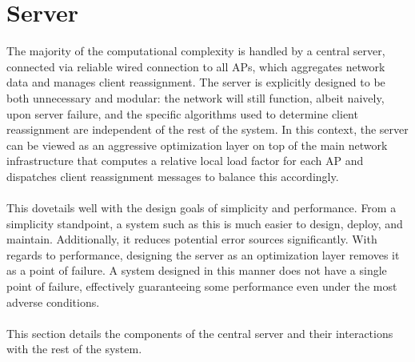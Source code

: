 \documentclass[10pt,journal,compsoc]{IEEEtran}
\begin{document}
		\section{Server}
		The majority of the computational complexity is handled by a central server, connected via reliable wired connection to all APs, which aggregates network data and manages client reassignment. The server is explicitly designed to be both unnecessary and modular: the network will still function, albeit naively, upon server failure, and the specific algorithms used to determine client reassignment are independent of the rest of the system. In this context, the server can be viewed as an aggressive optimization layer on top of the main network infrastructure that computes a relative local load factor for each AP and dispatches client reassignment messages to balance this accordingly. \\
		\\
		This dovetails well with the design goals of simplicity and performance. From a simplicity standpoint, a system such as this is much easier to design, deploy, and maintain. Additionally, it reduces potential error sources significantly. With regards to performance, designing the server as an optimization layer removes it as a point of failure. A system designed in this manner does not have a single point of failure, effectively guaranteeing some performance even under the most adverse conditions.\\
		\\
		This section details the components of the central server and their interactions with the rest of the system.
		
\end{document}
